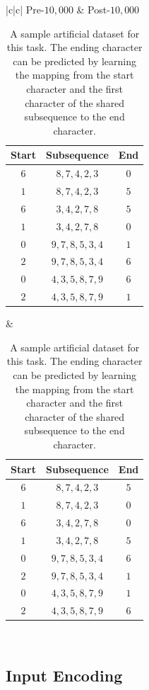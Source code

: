 \documentclass{article}
\begin{document}
\begin{table}[H]
    \centering
    \begin{tabular}{|c|c|} \hline
        Pre-$10,000$ & Post-$10,000$  \\ \hline
        \begin{tabular}{|c|c|c|}
            Start & Subsequence & End \\ \hline
            $6$ & $8, 7, 4, 2, 3$ & $0$ \\ \hline
            $1$ & $8, 7, 4, 2, 3$ & $5$ \\ \hline
            $6$ & $3, 4, 2, 7, 8$ & $5$ \\ \hline
            $1$ & $3, 4, 2, 7, 8$ & $0$ \\ \hline
            $0$ & $9, 7, 8, 5, 3, 4$ & $1$ \\ \hline
            $2$ & $9, 7, 8, 5, 3, 4$ & $6$ \\ \hline
            $0$ & $4, 3, 5, 8, 7, 9$ & $6$ \\ \hline
            $2$ & $4, 3, 5, 8, 7, 9$ & $1$ \\ \hline
        \end{tabular} &  \begin{tabular}{|c|c|c|}
            Start & Subsequence & End \\ \hline
            $6$ & $8, 7, 4, 2, 3$ & $5$ \\ \hline
            $1$ & $8, 7, 4, 2, 3$ & $0$ \\ \hline
            $6$ & $3, 4, 2, 7, 8$ & $0$ \\ \hline
            $1$ & $3, 4, 2, 7, 8$ & $5$ \\ \hline
            $0$ & $9, 7, 8, 5, 3, 4$ & $6$ \\ \hline
            $2$ & $9, 7, 8, 5, 3, 4$ & $1$ \\ \hline
            $0$ & $4, 3, 5, 8, 7, 9$ & $1$ \\ \hline
            $2$ & $4, 3, 5, 8, 7, 9$ & $6$ \\ \hline
        \end{tabular}\\ \hline
    \end{tabular}
    \caption{A sample artificial dataset for this task. The ending character can be predicted by learning the mapping from the start character and the first character of the shared subsequence to the end character.}
    \label{tab:dataset}
\end{table}

\subsection*{Input Encoding}
\end{document}
